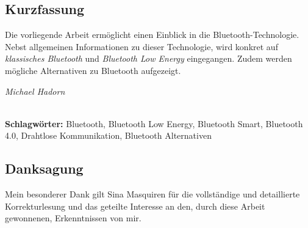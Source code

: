 
\subsection*{Kurzfassung}
Die vorliegende Arbeit ermöglicht einen Einblick in die Bluetooth-Technologie.
Nebst allgemeinen Informationen zu dieser Technologie, wird konkret auf \textit{klassisches Bluetooth} und \textit{Bluetooth Low Energy} eingegangen.
Zudem werden mögliche Alternativen zu Bluetooth aufgezeigt.
\begin{flushright}
\textit{Michael Hadorn}	
\end{flushright}

%
\mbox{}\\[0.5\baselineskip]\noindent
\textbf{Schlagwörter:} 
Bluetooth, Bluetooth Low Energy, Bluetooth Smart, Bluetooth 4.0, Drahtlose Kommunikation, Bluetooth Alternativen

\vfill
\subsection*{Danksagung}
Mein besonderer Dank gilt Sina Masquiren für die vollständige und detaillierte Korrekturlesung und das geteilte Interesse an den, durch diese Arbeit gewonnenen, Erkenntnissen von mir.
